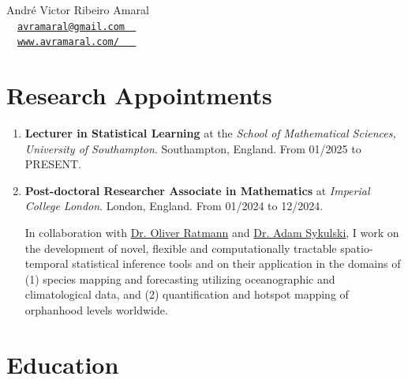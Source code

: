 \documentclass[10pt, ]{article}
\begin{document}
	
	\begin{center}
		{\LARGE André Victor Ribeiro Amaral} \\ \vspace{3pt}
		{\small\faEnvelope~~\href{mailto:avramaral@gmail.com}{\texttt{avramaral@gmail.com~~}}} \\
		{\small\faDesktop~~\href{https://www.avramaral.com/}{\texttt{www.avramaral.com/~~~}}}	%
	\end{center}
	
	\vspace{-12pt}
	\section*{Research Appointments} \vspace{-5pt}
	
	\begin{enumerate}[noitemsep, topsep=0pt]
		\item \textbf{Lecturer in Statistical Learning} at the \textit{School of Mathematical Sciences, University of Southampton}. Southampton, England. From 01/2025 to PRESENT.  \vspace{3pt}
		
		\item \textbf{Post-doctoral Researcher Associate in Mathematics} at \textit{Imperial College London}. London, England. From 01/2024 to 12/2024. \vspace{3pt}
		
		In collaboration with \href{https://www.imperial.ac.uk/people/oliver.ratmann05}{Dr. Oliver Ratmann} and \href{https://www.imperial.ac.uk/people/adam.sykulski}{Dr. Adam Sykulski}, I work on the development of novel, flexible and computationally tractable spatio-temporal statistical inference tools and on their application in the domains of (1) species mapping and forecasting utilizing oceanographic and climatological data, and (2) quantification and hotspot mapping of orphanhood levels worldwide.
		
	\end{enumerate}
	
	\vspace{10pt}
	
	\vspace{-12pt}
	\section*{Education} \vspace{-5pt}
	
\end{document}
